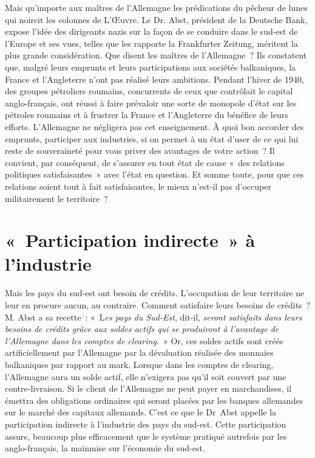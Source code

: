 \documentclass[french,twoside]{book} %
\begin{document}
Mais qu’importe aux maîtres de l’Allemagne les prédications du pêcheur de lunes qui noircit les colonnes de L’Œuvre. Le Dr. Abst, président de la Deutsche Bank, expose l’idée des dirigeants nazis sur la façon de se conduire dans le sud-est de l’Europe et ses vues, telles que les rapporte la Frankfurter Zeitung, méritent la plus grande considération. Que disent les maîtres de l’Allemagne ? Ils constatent que, malgré leurs emprunts et leurs participations aux sociétés balkaniques, la France et l’Angleterre n’ont pas réalisé leurs ambitions. Pendant l’hiver de 1940, des groupes pétroliers roumains, concurrents de ceux que contrôlait le capital anglo-français, ont réussi à faire prévaloir une sorte de monopole d’état sur les pétroles roumains et à frustrer la France et l’Angleterre du bénéfice de leurs efforts. L’Allemagne ne négligera pas cet enseignement. À quoi bon accorder des emprunts, participer aux industries, si on permet à un état d’user de ce qui lui reste de souveraineté pour vous priver des avantages de votre action ? Il convient, par conséquent, de s’assurer en tout état de cause « des relations politiques satisfaisantes » avec l’état en question. Et somme toute, pour que ces relations soient tout à fait satisfaisantes, le mieux n’est-il pas d’occuper militairement le territoire ?
\section[« Participation indirecte » à l’industrie]{« Participation indirecte » à l’industrie}
\noindent Mais les pays du sud-est ont besoin de crédits. L’occupation de leur territoire ne leur en procure aucun, au contraire. Comment satisfaire leurs besoins de crédits ? M. Abst a sa recette : « L\emph{es pays du Sud-Est}, dit-il, \emph{seront satisfaits dans leurs besoins de crédits grâce aux soldes actifs qui se produiront à l’avantage de l’Allemagne dans les comptes de clearing.} » Or, ces soldes actifs sont créés artificiellement par l’Allemagne par la dévaluation réalisée des monnaies balkaniques par rapport au mark. Lorsque dans les comptes de clearing, l’Allemagne aura un solde actif, elle n’exigera pas qu’il soit couvert par une contre-livraison. Si le client de l’Allemagne ne peut payer en marchandises, il émettra des obligations ordinaires qui seront placées par les banques allemandes sur le marché des capitaux allemands. C’est ce que le Dr Abst appelle la participation indirecte à l’industrie des pays du sud-est. Cette participation assure, beaucoup plus efficacement que le système pratiqué autrefois par les anglo-français, la mainmise sur l’économie du sud-est.
\end{document}
